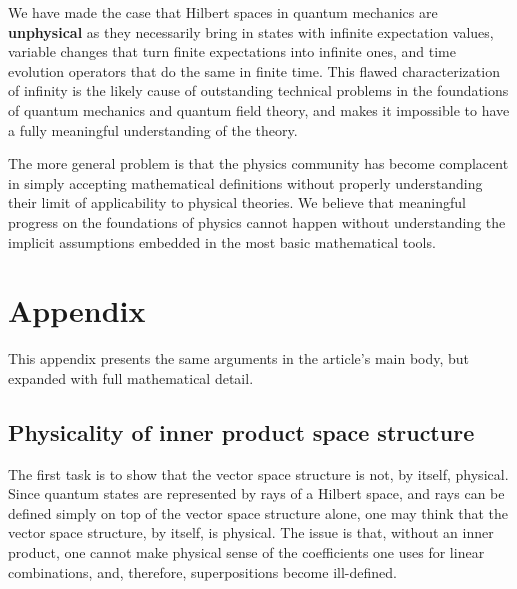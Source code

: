 \documentclass[10pt,twocolumn, nofootinbib]{revtex4-2}
\begin{document}
We have made the case that Hilbert spaces in quantum mechanics are \textbf{unphysical} as they necessarily bring in states with infinite expectation values, variable changes that turn finite expectations into infinite ones, and time evolution operators that do the same in finite time. This flawed characterization of infinity is the likely cause of outstanding technical problems in the foundations of quantum mechanics and quantum field theory, and makes it impossible to have a fully meaningful understanding of the theory.

The more general problem is that the physics community has become complacent in simply accepting mathematical definitions without properly understanding their limit of applicability to physical theories. We believe that meaningful progress on the foundations of physics cannot happen without understanding the implicit assumptions embedded in the most basic mathematical tools.



\newcommand{\pj}[1] {\underbar{$#1$}}

\section*{Appendix}

This appendix presents the same arguments in the article's main body, but expanded with full mathematical detail.

\subsection{Physicality of inner product space structure}

The first task is to show that the vector space structure is not, by itself, physical. Since quantum states are represented by rays of a Hilbert space, and rays can be defined simply on top of the vector space structure alone, one may think that the vector space structure, by itself, is physical. The issue is that, without an inner product, one cannot make physical sense of the coefficients one uses for linear combinations, and, therefore, superpositions become ill-defined.
\end{document}

